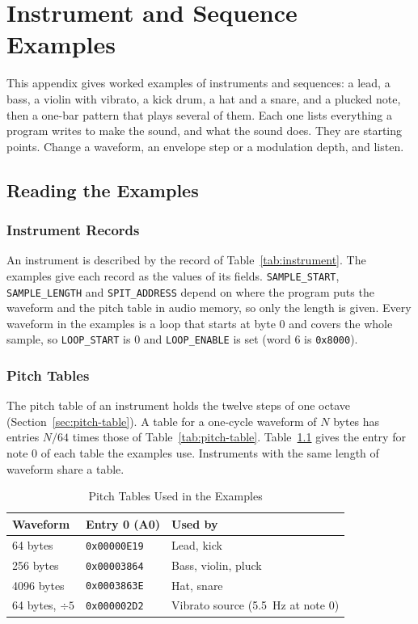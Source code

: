 \chapter{Instrument and Sequence Examples}
\label{app:examples}

This appendix gives worked examples of instruments and sequences: a lead, a bass, a violin with vibrato, a kick drum, a
hat and a snare, and a plucked note, then a one-bar pattern that plays several of them. Each one lists everything a
program writes to make the sound, and what the sound does. They are starting points. Change a waveform, an envelope
step or a modulation depth, and listen.

\section{Reading the Examples}

\subsection{Instrument Records}

An instrument is described by the record of Table~\ref{tab:instrument}. The examples give each record as the values of
its fields. \texttt{SAMPLE\_START}, \texttt{SAMPLE\_LENGTH} and \texttt{SPIT\_ADDRESS} depend on where the program puts
the waveform and the pitch table in audio memory, so only the length is given. Every waveform in the examples is a loop
that starts at byte 0 and covers the whole sample, so \texttt{LOOP\_START} is 0 and \texttt{LOOP\_ENABLE} is set (word
6 is \texttt{0x8000}).

\subsection{Pitch Tables}

The pitch table of an instrument holds the twelve steps of one octave (Section~\ref{sec:pitch-table}). A table for a
one-cycle waveform of $N$ bytes has entries $N/64$ times those of Table~\ref{tab:pitch-table}.
Table~\ref{tab:example-spit} gives the entry for note 0 of each table the examples use. Instruments with the same
length of waveform share a table.

\begin{table}[H]
	\centering
	\begin{tabular}{lll}
		\toprule
		\textbf{Waveform}  & \textbf{Entry 0 (A0)} & \textbf{Used by}                  \\
		\midrule
		64 bytes           & \texttt{0x00000E19}   & Lead, kick                        \\
		256 bytes          & \texttt{0x00003864}   & Bass, violin, pluck               \\
		4096 bytes         & \texttt{0x0003863E}   & Hat, snare                        \\
		64 bytes, $\div 5$ & \texttt{0x000002D2}   & Vibrato source (5.5~Hz at note 0) \\
		\bottomrule
	\end{tabular}
	\caption{Pitch Tables Used in the Examples}
	\label{tab:example-spit}
\end{table}

